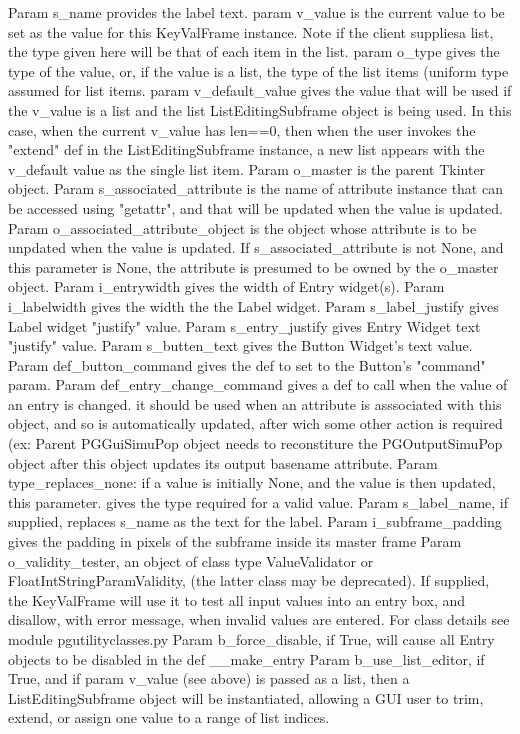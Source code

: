 \begin{DoxyVerb}Param s_name provides the label text.
param v_value is the current value to be set as the
value for this KeyValFrame instance.  Note
if the client suppliesa list, the type given
here will be that of each item in the list.
param o_type gives the type of the value, or, if
the value is a list, the type of the list items
(uniform type assumed for list items.
param v_default_value gives the value that will be used
if the v_value is a list and the list ListEditingSubframe
object is being used.  In this case, when the current v_value
has len==0, then when the user invokes the "extend" def
in the ListEditingSubframe instance, a new list appears with
the v_default value as the single list item.
Param o_master is the parent Tkinter object.
Param s_associated_attribute is the name of 
    attribute instance that can be accessed
    using "getattr", and that will be
    updated when the value is updated.
Param o_associated_attribute_object is the object whose attribute
    is to be unpdated when the value is updated.  If
    s_associated_attribute is not None, and this parameter
    is None, the attribute is presumed to be
    owned by the o_master object.
Param i_entrywidth gives the width of Entry widget(s).
Param i_labelwidth gives the width the the Label widget.
Param s_label_justify gives Label widget "justify" value.
Param s_entry_justify gives Entry Widget text "justify" value.
Param s_butten_text gives the Button Widget's text value.
Param def_button_command gives the def to set to the Button's "command" param.
Param def_entry_change_command gives a def to call when the value of an entry is changed.             
      it should be used when an attribute is asssociated with this object,
      and so is automatically updated, after wich some other action is required 
      (ex: Parent PGGuiSimuPop object needs to reconstiture the PGOutputSimuPop object 
      after this object updates its output basename attribute.
Param type_replaces_none: if a value is initially None, and the value is then updated, 
      this parameter.
      gives the type required for a valid value.
Param s_label_name, if supplied, replaces s_name as the text for the label.
Param i_subframe_padding gives the padding in pixels of the subframe inside its master frame
Param o_validity_tester, an object of class type ValueValidator or FloatIntStringParamValidity,
      (the latter class may be deprecated). If supplied, the KeyValFrame will use it to test all
      input values into an entry box, and disallow, with error message, when invalid values are
      entered. For class details see module pgutilityclasses.py
Param b_force_disable, if True, will cause all Entry objects to be disabled 
      in the def __make_entry
Param b_use_list_editor, if True, and if param v_value (see above) is passed as a list, 
      then a ListEditingSubframe object will be instantiated, allowing a GUI user to
      trim, extend, or assign one value to a range of list indices.
\end{DoxyVerb}
 

